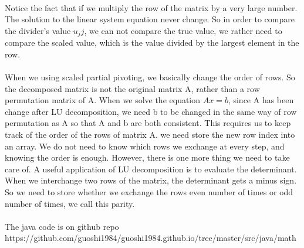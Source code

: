 \documentclass[a4paper]{article}
\begin{document}
\\
Notice the fact that if we multiply the row of the matrix by a very large number. The solution to the linear system equation never change. So in order to compare the divider's value $u_jj$, we can not compare the true value, we rather need to compare the scaled value, which is the value divided by the largest element in the row.\\

\\
When we using scaled partial pivoting, we basically change the order of rows. So the decomposed matrix is not the original matrix A, rather than a row permutation matrix of A. When we solve the equation $Ax=b$, since A has been change after LU decomposition, we need b to be changed in the same way of row permutation as A so that A and b are both consistent. This requires us to keep track of the order of the rows of matrix A. we need store the new row index into an array. We do not need to know which rows we exchange at every step, and knowing the order is enough. However, there is one more thing we need to take care of. A useful application of LU decomposition is to evaluate the determinant. When we interchange two rows of the matrix, the determinant gets a minus sign. So we need to store whether we exchange the rows even number of times or odd number of times, we call this parity.\\

\\
The java code is on github repo\\ 
https://github.com/guoshi1984/guoshi1984.github.io/tree/master/src/java/math\\
\end{document}
